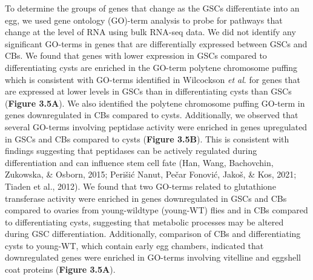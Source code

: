 \documentclass[12pt,oneside]{reedthesis}
\begin{document}

To determine the groups of genes that change as the GSCs differentiate
into an egg, we used gene ontology (GO)-term analysis to probe for
pathways that change at the level of RNA using bulk RNA-seq data. We did
not identify any significant GO-terms in genes that are differentially
expressed between GSCs and CBs. We found that genes with lower
expression in GSCs compared to differentiating cysts are enriched in the
GO-term polytene chromosome puffing which is consistent with GO-terms
identified in Wilcockson \emph{et al}. for genes that are expressed at lower
levels in GSCs than in differentiating cysts than GSCs (\textbf{Figure 3.5A}).
We also identified the polytene chromosome puffing GO-term in genes
downregulated in CBs compared to cysts. Additionally, we observed that
several GO-terms involving peptidase activity were enriched in genes
upregulated in GSCs and CBs compared to cysts (\textbf{Figure 3.5B}). This is
consistent with findings suggesting that peptidases can be actively
regulated during differentiation and can influence stem cell fate
(Han, Wang, Bachovchin, Zukowska, \& Osborn, 2015; Perišić Nanut, Pečar Fonović, Jakoš, \& Kos, 2021; Tiaden et al., 2012). We found that two GO-terms related to
glutathione transferase activity were enriched in genes downregulated in
GSCs and CBs compared to ovaries from young-wildtype (young-WT) flies
and in CBs compared to differentiating cysts, suggesting that metabolic
processes may be altered during GSC differentiation. Additionally,
comparison of CBs and differentiating cysts to young-WT, which contain
early egg chambers, indicated that downregulated genes were enriched in
GO-terms involving vitelline and eggshell coat proteins (\textbf{Figure 3.5A}).
\end{document}
